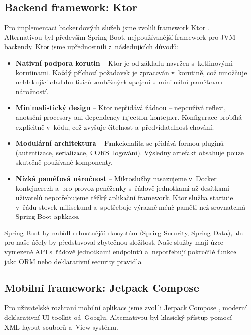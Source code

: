 \subsection{Backend framework: Ktor}

\begin{sloppypar}
Pro implementaci backendových služeb jsme zvolili framework
Ktor \cite{KtorFramework}. Alternativou byl především Spring Boot,
nejpoužívanější framework pro JVM back\-endy. Ktor jsme upřednostnili
z~následujících důvodů:
\end{sloppypar}

\begin{itemize}
\item \textbf{Nativní podpora korutin} -- Ktor je od základu navržen
  s~kotlinovými korutinami. Každý příchozí požadavek je zpracován v~korutině,
  což umožňuje neblokující obsluhu tisíců souběžných spojení s~minimální
  paměťovou náročností.
\item \textbf{Minimalistický design} -- Ktor nepřidává žádnou  --
  nepoužívá reflexi, anotační procesory ani dependency injection kontejner.
  Konfigurace probíhá explicitně v~kódu, což zvyšuje čitelnost
  a~předvídatelnost chování.
\item \textbf{Modulární architektura} -- Funkcionalita se přidává formou
  pluginů (autentizace, serializace, CORS, logování). Výsledný artefakt
  obsahuje pouze skutečně používané komponenty.
\item \textbf{Nízká paměťová náročnost} -- Mikroslužby nasazujeme v~Docker
  kontejnerech a~pro provoz peněženky s~řádově jednotkami až desítkami
  uživatelů nepotřebujeme těžký aplikační framework. Ktor služba startuje
  v~řádu stovek milisekund a~spotřebuje výrazně méně paměti než srovnatelná
  Spring Boot aplikace.
\end{itemize}

Spring Boot by nabídl robustnější ekosystém (Spring Security, Spring Data),
ale pro naše účely by představoval zbytečnou složitost. Naše služby mají
úzce vymezené API s~řádově jednotkami endpointů a~nepotřebují pokročilé
funkce jako ORM nebo deklarativní security pravidla.

\subsection{Mobilní framework: Jetpack Compose}

\begin{sloppypar}
Pro uživatelské rozhraní mobilní aplikace jsme zvolili Jetpack
Compose \cite{JetpackCompose}, moderní deklarativní UI toolkit
od~Googlu. Alternativou byl klasický přístup pomocí XML layout
souborů a~View systému.
\end{sloppypar}


